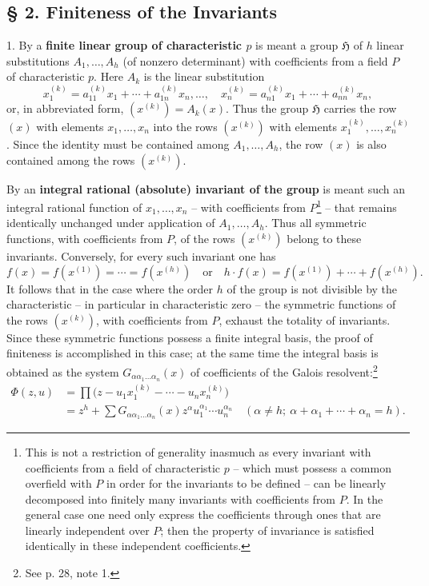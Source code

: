 \documentclass[11pt]{article}
\begin{document}
\subsection*{§ 2. Finiteness of the Invariants}

1. By a \textbf{finite linear group of characteristic $p$} is meant a group $\mathfrak H$ of $h$ linear substitutions $A_1,\ldots,A_h$ (of nonzero determinant) with coefficients from a field $P$ of characteristic $p$. Here $A_k$ is the linear substitution
\[
 x_1^{(k)}=a_{11}^{(k)}x_1+\cdots+a_{1n}^{(k)}x_n,\ldots,\quad
 x_n^{(k)}=a_{n1}^{(k)}x_1+\cdots+a_{nn}^{(k)}x_n,
\]
or, in abbreviated form, $(x^{(k)})=A_k(x)$. Thus the group $\mathfrak H$ carries the row $(x)$ with elements $x_1,
\ldots,x_n$ into the rows $(x^{(k)})$ with elements $x_1^{(k)},
\ldots,x_n^{(k)}$. Since the identity must be contained among $A_1,
\ldots,A_h$, the row $(x)$ is also contained among the rows $(x^{(k)})$.

By an \textbf{integral rational (absolute) invariant of the group} is meant such an integral rational function of $x_1,
\ldots,x_n$ -- with coefficients from $P$\footnote{This is not a restriction of generality inasmuch as every invariant with coefficients from a field of characteristic $p$ -- which must possess a common overfield with $P$ in order for the invariants to be defined -- can be linearly decomposed into finitely many invariants with coefficients from $P$. In the general case one need only express the coefficients through ones that are linearly independent over $P$; then the property of invariance is satisfied identically in these independent coefficients.} -- that remains identically unchanged under application of $A_1,
\ldots,A_h$. Thus all symmetric functions, with coefficients from $P$, of the rows $(x^{(k)})$ belong to these invariants. Conversely, for every such invariant one has
\[
 f(x)=f(x^{(1)})=\cdots=f(x^{(h)})
 \quad\text{or}\quad
 h\cdot f(x)=f(x^{(1)})+\cdots+f(x^{(h)}).
\]
It follows that in the case where the order $h$ of the group is not divisible by the characteristic -- in particular in characteristic zero -- the symmetric functions of the rows $(x^{(k)})$, with coefficients from $P$, exhaust the totality of invariants. Since these symmetric functions possess a finite integral basis, the proof of finiteness is accomplished in this case; at the same time the integral basis is obtained as the system $G_{\alpha\alpha_1\ldots\alpha_n}(x)$ of coefficients of the Galois resolvent:\footnote{See p. 28, note 1.}
\[
\begin{aligned}
 \Phi(z,u)&=\prod\bigl(z-u_1x_1^{(k)}-\cdots-u_nx_n^{(k)}\bigr)\\
 &=z^h+\sum G_{\alpha\alpha_1\ldots\alpha_n}(x)
 z^{\alpha}u_1^{\alpha_1}\cdots u_n^{\alpha_n}
 \quad(\alpha\ne h;\ \alpha+\alpha_1+\cdots+\alpha_n=h).
\end{aligned}
\]
\end{document}
